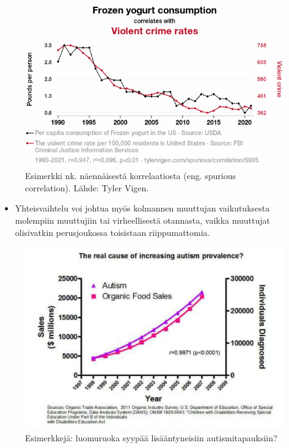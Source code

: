 \documentclass[
]{book}
\providecommand{\tightlist}{%
  \setlength{\itemsep}{0pt}\setlength{\parskip}{0pt}}
\begin{document}
\begin{figure}

{\centering \includegraphics[width=0.9\linewidth]{images/spuriouscorrelation} 

}

\caption{Esimerkki nk. näennäisestä korrelaatiosta (eng. spurious correlation). Lähde: Tyler Vigen.}\label{fig:spuriouskorrelation}
\end{figure}

\begin{itemize}
\tightlist
\item
  Yhteisvaihtelu voi johtua myös kolmannen muuttujan vaikutuksesta molempiin muuttujiin tai virheellisestä otannasta, vaikka muuttujat olisivatkin perusjoukossa toisistaan riippumattomia.
\end{itemize}

\FloatBarrier

\begin{figure}

{\centering \includegraphics[width=0.75\linewidth]{images/causality2} 

}

\caption{Esimerkkejä: luomuruoka syypää lisääntyneisiin autismitapauksiin?}\label{fig:unnamed-chunk-4}
\end{figure}
\end{document}
